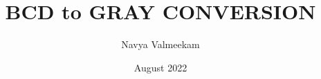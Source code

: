 \documentclass{article}
\title{BCD to GRAY CONVERSION}
\author{Navya Valmeekam}
\date{August 2022}
\begin{document}
\maketitle








\renewcommand\thesection{\arabic{section}}
\renewcommand\thesubsection{\thesection.\arabic{subsection}}
\renewcommand\thesubsubsection{\thesubsection.\arabic{subsubsection}}


\renewcommand\thesectiondis{\arabic{section}}
\renewcommand\thesubsectiondis{\thesectiondis.\arabic{subsection}}
\renewcommand\thesubsubsectiondis{\thesubsectiondis.\arabic{subsubsection}}


\def\inputGnumericTable{}                                 %

\lstset{
}
\end{document}
